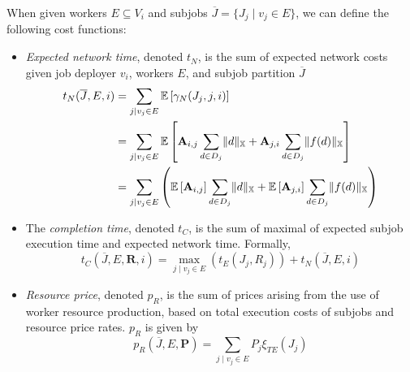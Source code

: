 \documentclass[../mthe-493-project-proposal.tex]{subfiles}
\begin{document}
    When given workers $E \subseteq V_i$ and subjobs $\overline{J} = \{J_j \mid v_j \in E\}$, we can define the following cost functions:
    \begin{itemize}
        \item \textit{Expected network time}, denoted $t_N$, is the sum of expected network costs given job deployer $v_i$, workers $E$, and subjob partition $\overline{J}$
              \begin{align}
                  t_N(\overline{J}, E, i) &= \sum_{j \mid v_j \in E} \mathbb{E} \left[ \gamma_N(J_j, j, i) \right] \label{eq:expected-network-time}                  \\
                                          &= \sum_{j \mid v_j \in E} \mathbb{E} \left[
                  \mathbf{A}_{i,j} \sum\limits_{d \in D_j} \lVert d\rVert_{\mathbb{X}} + \mathbf{A}_{j,i} \sum\limits_{d \in D_j} \lVert f(d)\rVert_{\mathbb{X}}
                  \right] \nonumber                                                                                                                                  \\
                                          &= \sum_{j \mid v_j \in E} \left( \mathbb{E} \left[ \mathbf{A}_{i,j} \right] \sum\limits_{d \in D_j} \lVert d\rVert_{\mathbb{X}}
                  + \mathbb{E} \left[ \mathbf{A}_{j,i} \right] \sum\limits_{d \in D_j} \lVert f(d)\rVert_{\mathbb{X}}
                  \right) \nonumber
              \end{align}

        \item The \textit{completion time}, denoted $t_C$, is the sum of maximal of expected subjob execution time and expected network time. Formally,
              \begin{equation}
                  \label{eq:completion-time}
                  t_C(\overline{J}, E, \mathbf{R}, i) = \max_{j \mid v_j \in E}
                  \left( t_E(J_j, R_j) \right)
                  + t_N(\overline{J}, E, i)
              \end{equation}

        \item \textit{Resource price}, denoted $p_R$, is the sum of prices arising from the use of worker resource production, based on total execution costs of subjobs and resource price rates. $p_R$ is given by
              \begin{equation}
                  \label{eq:resource-price}
                  p_R(\overline{J}, E, \mathbf{P}) = \sum_{j \mid v_j \in E} P_j \xi_{TE}(J_j)
              \end{equation}
    \end{itemize}
\end{document}
